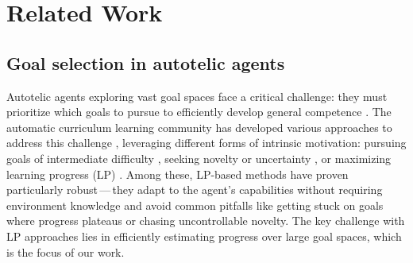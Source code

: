 \section{Related Work}
\label{sec:related_work}

\subsection{Goal selection in autotelic agents}
Autotelic agents exploring vast goal spaces face a critical challenge: they must prioritize which goals to pursue to efficiently develop general competence \citep{colas_autotelic_2022}. The automatic curriculum learning community has developed various approaches to address this challenge \cite{portelas_automatic_2020}, leveraging different forms of intrinsic motivation: pursuing goals of intermediate difficulty \citep{florensa_automatic_2018,racaniere_automated_2020, castanetSL23}, seeking novelty or uncertainty \cite{warde-farley_unsupervised_2018,pong_skew-fit_2020,pitis_maximum_2020}, or maximizing learning progress (LP) \cite{stout_competence_2010,matiisen_teacher-student_2017,fournier_accuracy-based_2018,portelas_teacher_2019,colas_curious_2019, kanitscheider_multi-task_2021,kovac_grimgep_2023,zhang_omni_2024}. Among these, LP-based methods have proven particularly robust\,---\,they adapt to the agent's capabilities without requiring environment knowledge and avoid common pitfalls like getting stuck on goals where progress plateaus or chasing uncontrollable novelty. The key challenge with LP approaches lies in efficiently estimating progress over large goal spaces, which is the focus of our work.


